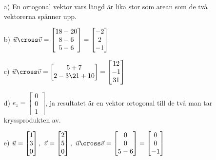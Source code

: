 \begin{itemize}
	\item[a) ] En ortogonal vektor vars längd är lika stor som arean som de två vektorerna spänner upp.
	\item[b) ] $\vec{u}\cross \vec{v}=\begin{bmatrix}18-20\\8-6\\5-6\end{bmatrix}=\begin{bmatrix}-2\\2\\-1\end{bmatrix}$
	\item[c) ] $\vec{u}\cross \vec{v}=\begin{bmatrix}5+7\\2-3\21+10\end{bmatrix}=\begin{bmatrix}12\\-1\\31\end{bmatrix}$
	\item[d) ] $e_z=\begin{bmatrix}0\\0\\1\end{bmatrix}$, ja resultatet är en vektor ortogonal till de två man tar kryssprodukten av.
	\item[e) ] $\vec{u}=\begin{bmatrix}1\\3\\0\end{bmatrix},\ \vec{v}=\begin{bmatrix}2\\5\\0\end{bmatrix},\ 
	\vec{u}\cross \vec{v}=\begin{bmatrix}0\\0\\5-6\end{bmatrix}=\begin{bmatrix}0\\0\\-1\end{bmatrix}$
\end{itemize}
